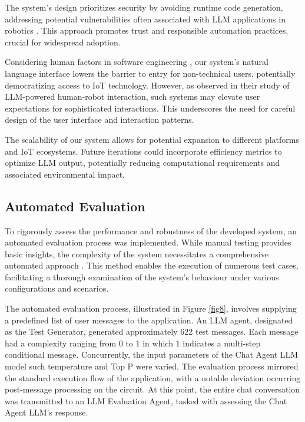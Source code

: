 \documentclass[lettersize,journal]{IEEEtran}
\begin{document}
The system's design prioritizes security by avoiding runtime code generation, addressing potential vulnerabilities often associated with LLM applications in robotics \cite{wang2024gensimgeneratingroboticsimulation}. This approach promotes trust and responsible automation practices, crucial for widespread adoption.

Considering human factors in software engineering \cite{1553657}, our system's natural language interface lowers the barrier to entry for non-technical users, potentially democratizing access to IoT technology. However, as \citet{10.1145/3610977.3634966} observed in their study of LLM-powered human-robot interaction, such systems may elevate user expectations for sophisticated interactions. This underscores the need for careful design of the user interface and interaction patterns.

The scalability of our system allows for potential expansion to different platforms and IoT ecosystems. Future iterations could incorporate efficiency metrics to optimize LLM output, potentially reducing computational requirements and associated environmental impact.

\subsection{Automated Evaluation}
To rigorously assess the performance and robustness of the developed system, an automated evaluation process was implemented. While manual testing provides basic insights, the complexity of the system necessitates a comprehensive automated approach \cite{1290484}. This method enables the execution of numerous test cases, facilitating a thorough examination of the system's behaviour under various configurations and scenarios.


The automated evaluation process, illustrated in Figure \ref{fig8}, involves supplying a predefined list of user messages to the application. An LLM agent, designated as the Test Generator, generated approximately 622 test messages. Each message had a complexity ranging from 0 to 1 in which 1 indicates a multi-step conditional message. Concurrently, the input parameters of the Chat Agent LLM model such temperature and Top P \cite{rum2024setting} were varied. The evaluation process mirrored the standard execution flow of the application, with a notable deviation occurring post-message processing on the circuit. At this point, the entire chat conversation was transmitted to an LLM Evaluation Agent, tasked with assessing the Chat Agent LLM's response. 
\end{document}

